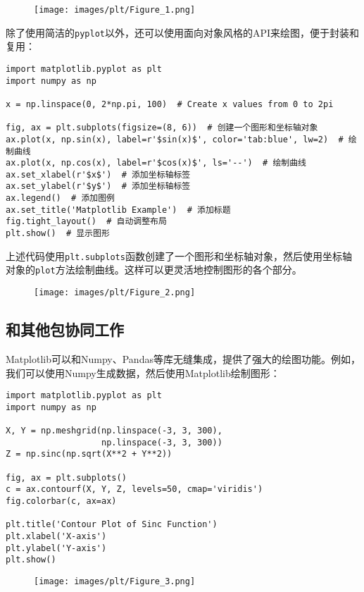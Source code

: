 \documentclass[../main.tex]{subfiles}
\begin{document}
\begin{figure}[htbp]
  \centering
  \texttt{[image: images/plt/Figure\_1.png]}
\end{figure}

除了使用简洁的\texttt{pyplot}以外，还可以使用面向对象风格的API来绘图，便于封装和复用：

\begin{lstlisting}
import matplotlib.pyplot as plt
import numpy as np

x = np.linspace(0, 2*np.pi, 100)  # Create x values from 0 to 2pi

fig, ax = plt.subplots(figsize=(8, 6))  # 创建一个图形和坐标轴对象
ax.plot(x, np.sin(x), label=r'$sin(x)$', color='tab:blue', lw=2)  # 绘制曲线
ax.plot(x, np.cos(x), label=r'$cos(x)$', ls='--')  # 绘制曲线
ax.set_xlabel(r'$x$')  # 添加坐标轴标签
ax.set_ylabel(r'$y$')  # 添加坐标轴标签
ax.legend()  # 添加图例
ax.set_title('Matplotlib Example')  # 添加标题
fig.tight_layout()  # 自动调整布局
plt.show()  # 显示图形
\end{lstlisting}
上述代码使用\texttt{plt.subplots}函数创建了一个图形和坐标轴对象，然后使用坐标轴对象的\texttt{plot}方法绘制曲线。这样可以更灵活地控制图形的各个部分。

\begin{figure}[htbp]
  \centering
  \texttt{[image: images/plt/Figure\_2.png]}
\end{figure}

\subsection{和其他包协同工作}

Matplotlib可以和Numpy、Pandas等库无缝集成，提供了强大的绘图功能。例如，我们可以使用Numpy生成数据，然后使用Matplotlib绘制图形：
\begin{lstlisting}
import matplotlib.pyplot as plt
import numpy as np

X, Y = np.meshgrid(np.linspace(-3, 3, 300),
                   np.linspace(-3, 3, 300))
Z = np.sinc(np.sqrt(X**2 + Y**2))

fig, ax = plt.subplots()
c = ax.contourf(X, Y, Z, levels=50, cmap='viridis')
fig.colorbar(c, ax=ax)

plt.title('Contour Plot of Sinc Function')
plt.xlabel('X-axis')
plt.ylabel('Y-axis')
plt.show()
\end{lstlisting}

\begin{figure}
  \centering
  \texttt{[image: images/plt/Figure\_3.png]}
\end{figure}
\end{document}
